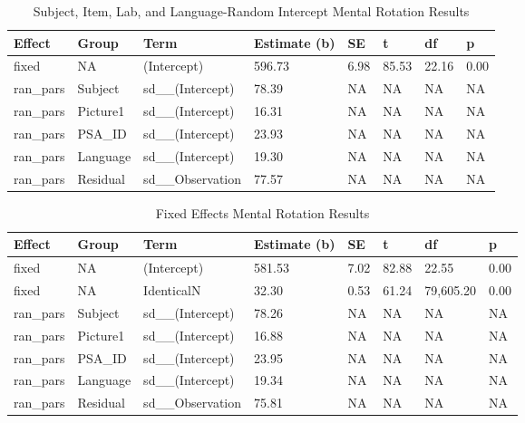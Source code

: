 \documentclass[
  man,floatsintext]{apa7}
\begin{document}
\begin{table}[tbp]

\begin{center}
\begin{threeparttable}

\caption{\label{tab:lang_e}Subject, Item, Lab, and Language-Random Intercept Mental Rotation Results}

\begin{tabular}{llllllll}
\toprule
Effect & Group & Term & Estimate (b) & SE & t & df & p\\
\midrule
fixed & NA & (Intercept) & 596.73 & 6.98 & 85.53 & 22.16 & 0.00\\
ran\_pars & Subject & sd\_\_(Intercept) & 78.39 & NA & NA & NA & NA\\
ran\_pars & Picture1 & sd\_\_(Intercept) & 16.31 & NA & NA & NA & NA\\
ran\_pars & PSA\_ID & sd\_\_(Intercept) & 23.93 & NA & NA & NA & NA\\
ran\_pars & Language & sd\_\_(Intercept) & 19.30 & NA & NA & NA & NA\\
ran\_pars & Residual & sd\_\_Observation & 77.57 & NA & NA & NA & NA\\
\bottomrule
\end{tabular}

\end{threeparttable}
\end{center}

\end{table}

\begin{table}[tbp]

\begin{center}
\begin{threeparttable}

\caption{\label{tab:fixed_e}Fixed Effects Mental Rotation Results}

\begin{tabular}{llllllll}
\toprule
Effect & Group & Term & Estimate (b) & SE & t & df & p\\
\midrule
fixed & NA & (Intercept) & 581.53 & 7.02 & 82.88 & 22.55 & 0.00\\
fixed & NA & IdenticalN & 32.30 & 0.53 & 61.24 & 79,605.20 & 0.00\\
ran\_pars & Subject & sd\_\_(Intercept) & 78.26 & NA & NA & NA & NA\\
ran\_pars & Picture1 & sd\_\_(Intercept) & 16.88 & NA & NA & NA & NA\\
ran\_pars & PSA\_ID & sd\_\_(Intercept) & 23.95 & NA & NA & NA & NA\\
ran\_pars & Language & sd\_\_(Intercept) & 19.34 & NA & NA & NA & NA\\
ran\_pars & Residual & sd\_\_Observation & 75.81 & NA & NA & NA & NA\\
\bottomrule
\end{tabular}

\end{threeparttable}
\end{center}

\end{table}
\end{document}
